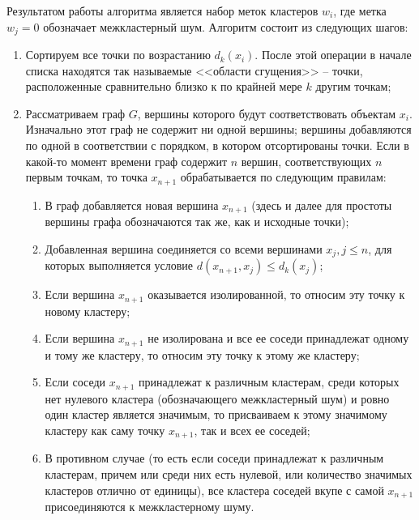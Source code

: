 Результатом работы алгоритма является набор меток кластеров $w_i$, где метка $w_j = 0$ обозначает межкластерный шум. Алгоритм состоит из следующих шагов:
\begin{enumerate}
\item
    Сортируем все точки по возрастанию $d_k(x_i)$. После этой операции в начале списка находятся так называемые <<области сгущения>> -- точки, расположенные сравнительно близко к по крайней мере $k$ другим точкам;
\item
    Рассматриваем граф $G$, вершины которого будут соответствовать объектам $x_i$.
    Изначально этот граф не содержит ни одной вершины; вершины добавляются по одной в соответствии с порядком, в котором отсортированы точки.
    Если в какой-то момент времени граф содержит $n$ вершин, соответствующих $n$ первым точкам, то точка $x_{n+1}$ обрабатывается по следующим правилам:
    \begin{enumerate}
    \item
        В граф добавляется новая вершина $x_{n+1}$ (здесь и далее для простоты вершины графа обозначаются так же, как и исходные точки);
    \item
        Добавленная вершина соединяется со всеми вершинами $x_{j}, j \leq n$, для которых выполняется условие $d\left( x_{n+1}, x_j \right) \leq d_k\left( x_j \right)$;
    \item
        Если вершина $x_{n+1}$ оказывается изолированной, то относим эту точку к новому кластеру;
    \item
        Если вершина $x_{n+1}$ не изолирована и все ее соседи принадлежат одному и тому же кластеру, то относим эту точку к этому же кластеру;
    \item
        Если соседи $x_{n+1}$ принадлежат к различным кластерам, среди которых нет нулевого кластера (обозначающего межкластерный шум) и ровно один кластер является значимым, то присваиваем к этому значимому кластеру как саму точку $x_{n+1}$, так и всех ее соседей;
    \item
        В противном случае (то есть если соседи принадлежат к различным кластерам, причем или среди них есть нулевой, или количество значимых кластеров отлично от единицы),  %
        все кластера соседей вкупе с самой $x_{n+1}$ присоединяются к межкластерному шуму.
    \end{enumerate}
\end{enumerate}

